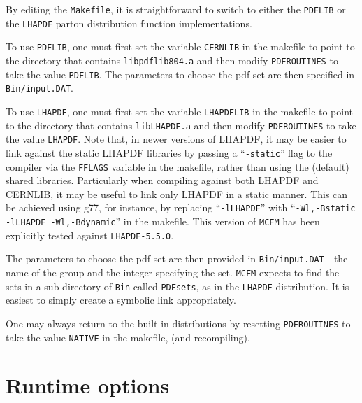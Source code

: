 \documentclass[12pt]{article}
\begin{document}
By editing the {\tt Makefile}, it is straightforward to switch to
either the {\tt PDFLIB} or the {\tt LHAPDF} parton distribution
function implementations.

To use {\tt PDFLIB}, one must first set the variable {\tt CERNLIB}
in the makefile to point to the directory that contains
{\tt libpdflib804.a} and then modify {\tt PDFROUTINES} to
take the value {\tt PDFLIB}. The parameters to choose the
pdf set are then specified in {\tt Bin/input.DAT}.

To use {\tt LHAPDF}, one must first set the variable {\tt LHAPDFLIB}
in the makefile to point to the directory that contains
{\tt libLHAPDF.a} and then modify {\tt PDFROUTINES} to
take the value {\tt LHAPDF}. Note that, in newer versions of LHAPDF,
it may be easier to link against the static LHAPDF libraries by passing
a ``{\tt -static}'' flag to the compiler via the {\tt FFLAGS} variable
in the makefile, rather than using the (default) shared libraries.
Particularly when compiling against both LHAPDF and CERNLIB, it may
be useful to link only LHAPDF in a static manner. This can be achieved
using g77, for instance, by replacing
 ``{\tt -lLHAPDF}'' with ``{\tt -Wl,-Bstatic -lLHAPDF -Wl,-Bdynamic}''
 in the makefile. This version of {\tt MCFM} has been explicitly tested
 against {\tt LHAPDF-5.5.0}.
 
The parameters to choose the
pdf set are then provided in {\tt Bin/input.DAT} - 
the name of the group and the integer specifying 
the set.
{\tt MCFM} expects to find the sets in a sub-directory of {\tt Bin} called
{\tt PDFsets}, as in the {\tt LHAPDF} distribution. It is easiest to
simply create a symbolic link appropriately.

One may always return to the built-in distributions by resetting
{\tt PDFROUTINES} to take the value {\tt NATIVE}  in the makefile,
(and recompiling).
\clearpage
\section{Runtime options}
\end{document}
